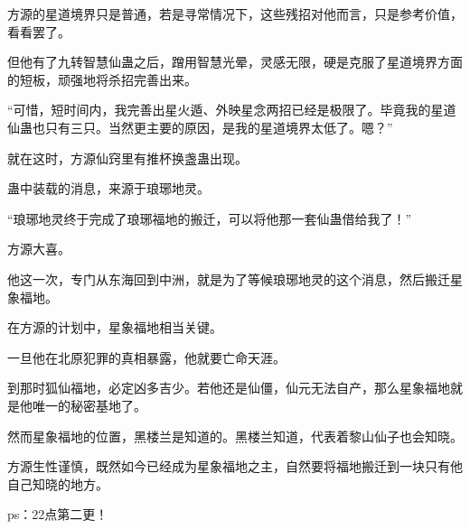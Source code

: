 \begin{this_body}
方源的星道境界只是普通，若是寻常情况下，这些残招对他而言，只是参考价值，看看罢了。

但他有了九转智慧仙蛊之后，蹭用智慧光晕，灵感无限，硬是克服了星道境界方面的短板，顽强地将杀招完善出来。

“可惜，短时间内，我完善出星火遁、外映星念两招已经是极限了。毕竟我的星道仙蛊也只有三只。当然更主要的原因，是我的星道境界太低了。嗯？”

就在这时，方源仙窍里有推杯换盏蛊出现。

蛊中装载的消息，来源于琅琊地灵。

“琅琊地灵终于完成了琅琊福地的搬迁，可以将他那一套仙蛊借给我了！”

方源大喜。

他这一次，专门从东海回到中洲，就是为了等候琅琊地灵的这个消息，然后搬迁星象福地。

在方源的计划中，星象福地相当关键。

一旦他在北原犯罪的真相暴露，他就要亡命天涯。

到那时狐仙福地，必定凶多吉少。若他还是仙僵，仙元无法自产，那么星象福地就是他唯一的秘密基地了。

然而星象福地的位置，黑楼兰是知道的。黑楼兰知道，代表着黎山仙子也会知晓。

方源生性谨慎，既然如今已经成为星象福地之主，自然要将福地搬迁到一块只有他自己知晓的地方。

ps：22点第二更！

\end{this_body}

